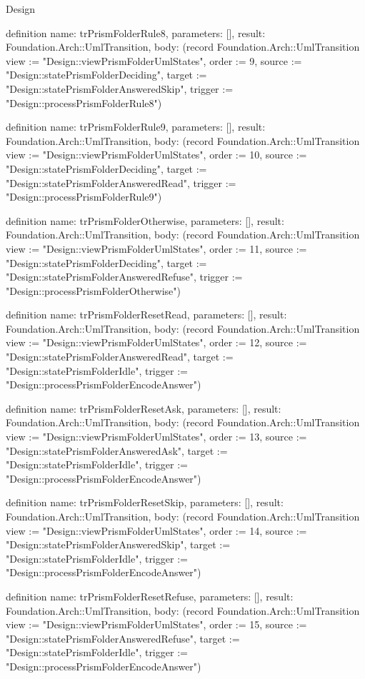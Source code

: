 \begin{lexlean}{Design}
\begin{semanticmodule}
definition{
  name: trPrismFolderRule8,
  parameters: [],
  result: Foundation.Arch::UmlTransition,
  body: (record Foundation.Arch::UmlTransition {view := "Design::viewPrismFolderUmlStates", order := 9, source := "Design::statePrismFolderDeciding", target := "Design::statePrismFolderAnsweredSkip", trigger := "Design::processPrismFolderRule8"})
}

definition{
  name: trPrismFolderRule9,
  parameters: [],
  result: Foundation.Arch::UmlTransition,
  body: (record Foundation.Arch::UmlTransition {view := "Design::viewPrismFolderUmlStates", order := 10, source := "Design::statePrismFolderDeciding", target := "Design::statePrismFolderAnsweredRead", trigger := "Design::processPrismFolderRule9"})
}

definition{
  name: trPrismFolderOtherwise,
  parameters: [],
  result: Foundation.Arch::UmlTransition,
  body: (record Foundation.Arch::UmlTransition {view := "Design::viewPrismFolderUmlStates", order := 11, source := "Design::statePrismFolderDeciding", target := "Design::statePrismFolderAnsweredRefuse", trigger := "Design::processPrismFolderOtherwise"})
}

definition{
  name: trPrismFolderResetRead,
  parameters: [],
  result: Foundation.Arch::UmlTransition,
  body: (record Foundation.Arch::UmlTransition {view := "Design::viewPrismFolderUmlStates", order := 12, source := "Design::statePrismFolderAnsweredRead", target := "Design::statePrismFolderIdle", trigger := "Design::processPrismFolderEncodeAnswer"})
}

definition{
  name: trPrismFolderResetAsk,
  parameters: [],
  result: Foundation.Arch::UmlTransition,
  body: (record Foundation.Arch::UmlTransition {view := "Design::viewPrismFolderUmlStates", order := 13, source := "Design::statePrismFolderAnsweredAsk", target := "Design::statePrismFolderIdle", trigger := "Design::processPrismFolderEncodeAnswer"})
}

definition{
  name: trPrismFolderResetSkip,
  parameters: [],
  result: Foundation.Arch::UmlTransition,
  body: (record Foundation.Arch::UmlTransition {view := "Design::viewPrismFolderUmlStates", order := 14, source := "Design::statePrismFolderAnsweredSkip", target := "Design::statePrismFolderIdle", trigger := "Design::processPrismFolderEncodeAnswer"})
}

definition{
  name: trPrismFolderResetRefuse,
  parameters: [],
  result: Foundation.Arch::UmlTransition,
  body: (record Foundation.Arch::UmlTransition {view := "Design::viewPrismFolderUmlStates", order := 15, source := "Design::statePrismFolderAnsweredRefuse", target := "Design::statePrismFolderIdle", trigger := "Design::processPrismFolderEncodeAnswer"})
}


\end{semanticmodule}
\end{lexlean}
